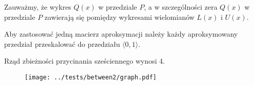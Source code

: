 \documentclass{article}
\begin{document}
Zauważmy, że wykres $Q(x)$ w przedziale $P$, a w szczególności zera $Q(x)$ w przedziale $P$ zawierają się pomiędzy wykresami wielomianów $L(x)$ i $U(x)$.

Aby zastosować jedną macierz aproksymacji należy każdy aproksymowany przedział przeskalować do przedziału $\langle 0, 1 \rangle$.

Rząd zbieżności przycinania sześciennego wynosi 4.

\begin{center}
  \begin{figure}
    \texttt{[image: ../tests/between2/graph.pdf]}
  \end{figure}
\end{center}
\end{document}
